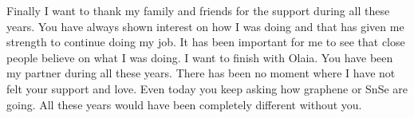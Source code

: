 Finally I want to thank my family and friends for the support during all these years. You have always shown interest 
on how I was doing and that has given me strength to continue doing my job. It has been important for me to see that 
close people believe on what I was doing. I want to finish with Olaia. You have  been my partner during all these 
years. There has been no moment where I have not felt your support and love. Even today you keep asking how graphene 
or SnSe are going. All these years would have been completely different without you. 
